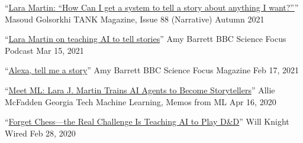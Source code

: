{\color{black}\fontsize{12pt}{1em}} 








  \cvmedia
    {``\href{https://tankmagazine.com/issue-88/talk/lara-martin}{Lara Martin: ``How Can I get a system to tell a story about anything I want?''}''} %
    {Masoud Golsorkhi} %
    {TANK Magazine, Issue 88 (Narrative)} %
    {Autumn 2021} %

  \cvmedia
    {``\href{https://www.sciencefocus.com/future-technology/lara-martin-on-teaching-ai-to-tell-stories/}{Lara Martin on teaching AI to tell stories}''} %
    {Amy Barrett} %
    {BBC Science Focus Podcast} %
    {Mar 15, 2021} %

  \cvmedia
    {``\href{https://www.sciencefocus.com/magazine/dark-stars/}{Alexa, tell me a story}''} %
    {Amy Barrett} %
    {BBC Science Focus Magazine} %
    {Feb 17, 2021} %

  \cvmedia
    {``\href{https://mlatgt.blog/2020/04/16/meet-mlgt-lara-j-martin-trains-ai-agents-to-become-storytellers/}{Meet ML\@GT: Lara J. Martin Trains AI Agents to Become Storytellers}''} %
    {Allie McFadden} %
    {Georgia Tech Machine Learning, Memos from ML\@GT} %
    {Apr 16, 2020} %

  \cvmedia
    {``\href{https://www.wired.com/story/forget-chess-real-challenge-teaching-ai-play-dandd/}{Forget Chess---the Real Challenge Is Teaching AI to Play D\&D}''} %
    {Will Knight} %
    {Wired} %
    {Feb 28, 2020} %

